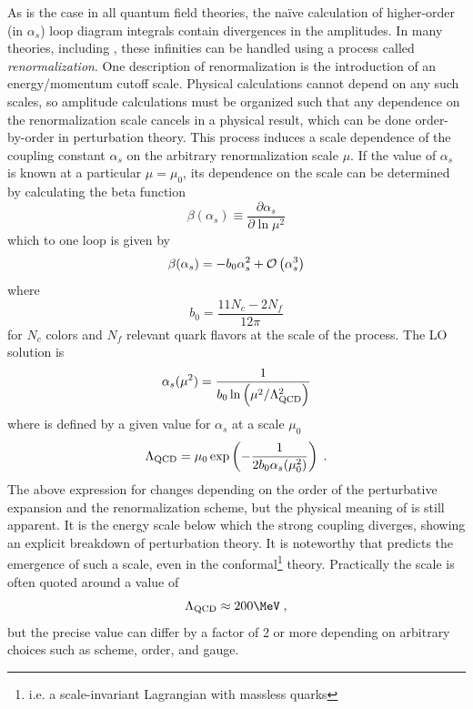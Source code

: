 
As is the case in all quantum field theories, the na\"ive calculation of higher-order (in $\alpha_s$) loop diagram integrals contain divergences in the amplitudes.
In many theories, including \qcd \cite{Gross:1973ju}, these infinities can be handled using a process called \emph{renormalization}.
One description of renormalization is the introduction of an energy/momentum cutoff scale.
Physical calculations cannot depend on any such scales, so amplitude calculations must be organized such that any dependence on the renormalization scale cancels in a physical result, which can be done order-by-order in perturbation theory.
This process induces a scale dependence of the coupling constant $\alpha_s$ on the arbitrary renormalization scale $\mu$.
If the value of $\alpha_s$ is known at a particular $\mu = \mu_0$, its dependence on the scale can be determined by calculating the beta function
\begin{equation}
  \beta(\alpha_s) \equiv  \frac{\partial \alpha_s}{\partial \ln \mu^2}
\end{equation}
which to one loop is given by \cite{Gross:1973id}
\begin{equation}
  \beta(\alpha_s) = -b_0 \alpha_s^2 + \mathcal{O}\left( \alpha_s^3 \right)
\end{equation}
where
\[
b_0 = \frac{11 N_c - 2 N_f}{12\pi}
\]
for $N_c$ colors and $N_f$ relevant quark flavors at the scale of the process.
The \ac{LO} solution is
\begin{equation}
  \alpha_s(\mu^2) = \frac{1}{b_0 \ln\left(\mu^2 / \Lambda_\textrm{QCD}^2\right)}
  \label{eq:running_as}
\end{equation}
where \lqcd is defined by a given value for $\alpha_s$ at a scale $\mu_0$
\[
\Lambda_\textrm{QCD} = \mu_0 \exp \left( -\frac{1}{2 b_0 \alpha_s(\mu_0^2)} \right) \; .
\]
The above expression for \lqcd changes depending on the order of the perturbative expansion and the renormalization scheme, but the physical meaning of \lqcd is still apparent.
It is the energy scale below which the strong coupling diverges, showing an explicit breakdown of perturbation theory.
It is noteworthy that \qcd predicts the emergence of such a scale, even in the conformal\footnote{i.e. a scale-invariant Lagrangian with massless quarks} theory.
Practically the \qcd scale is often quoted around a value of %
\[
\lqcd \approx 200 \MeV \;,
\]
but the precise value can differ by a factor of 2 or more depending on arbitrary choices such as scheme, order, and gauge.

